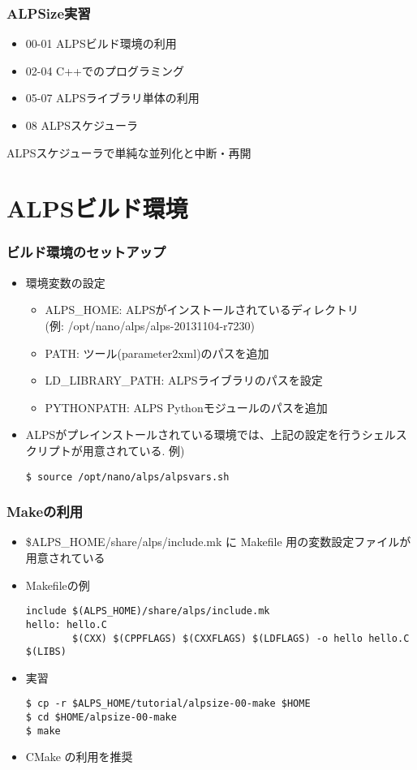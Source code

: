 \begin{frame}
  \frametitle{ALPSize実習}
  \begin{itemize}
  \item 00-01 ALPSビルド環境の利用
  \item 02-04 C++でのプログラミング
  \item 05-07 ALPSライブラリ単体の利用
  \item \alert{08 ALPSスケジューラ}
  \end{itemize}
  \begin{block}{}
    ALPSスケジューラで単純な並列化と中断・再開
  \end{block}
\end{frame}

\section{ALPSビルド環境}
\begin{frame}[c,fragile]
  \frametitle{ビルド環境のセットアップ}
  \begin{itemize}
    \setlength{\itemsep}{1em}
  \item 環境変数の設定
    \begin{itemize}
    \item {\color{red} ALPS\_HOME}: ALPSがインストールされているディレクトリ\\ (例: /opt/nano/alps/alps-20131104-r7230)
    \item {\color{red} PATH}: ツール(parameter2xml)のパスを追加
    \item {\color{red} LD\_LIBRARY\_PATH}: ALPSライブラリのパスを設定
    \item {\color{red} PYTHONPATH}: ALPS Pythonモジュールのパスを追加
    \end{itemize}
  \item ALPSがプレインストールされている環境では、上記の設定を行うシェルスクリプトが用意されている. 例)
\begin{lstlisting}
$ source /opt/nano/alps/alpsvars.sh
\end{lstlisting}
  \end{itemize}
\end{frame}

\begin{frame}[c,fragile]
  \frametitle{Makeの利用}
  \begin{itemize}
  \item \$ALPS\_HOME/share/alps/include.mk に Makefile 用の変数設定ファイルが用意されている
  \item Makefileの例
\begin{lstlisting}
include $(ALPS_HOME)/share/alps/include.mk
hello: hello.C
        $(CXX) $(CPPFLAGS) $(CXXFLAGS) $(LDFLAGS) -o hello hello.C $(LIBS)
\end{lstlisting}
  \item 実習
\begin{lstlisting}
$ cp -r $ALPS_HOME/tutorial/alpsize-00-make $HOME
$ cd $HOME/alpsize-00-make
$ make
\end{lstlisting}
  \item {\color{blue} CMake の利用を推奨}
  \end{itemize}
\end{frame}

